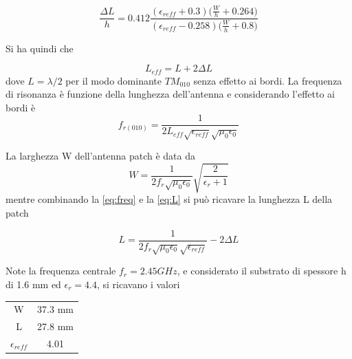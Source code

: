 \documentclass[twoside,twocolumn]{article}
\begin{document}
\begin{equation}
\frac{\Delta L}{h}= 0.412\frac{(\epsilon_{reff}+0.3)\Big(\frac{W}{h}+0.264\Big)}{(\epsilon_{reff}-0.258)\Big(\frac{W}{h}+0.8\Big)}
\end{equation}

Si ha quindi che

\begin{equation}\label{eq:L}
L_{eff}=L+2\Delta L
\end{equation}
dove $L=\lambda/2$ per il modo dominante $TM_{010}$ senza effetto ai bordi.
La frequenza di risonanza è funzione della lunghezza dell'antenna e considerando l'effetto ai bordi è 
\begin{equation} \label{eq:freq}
f_{r(010)}=\frac{1}{2L_{eff}\sqrt{\epsilon_{reff}}\sqrt{\mu_{0}\epsilon_{0}}}
\end{equation}

La larghezza W dell'antenna patch è data da 
\begin{equation}
W=\frac{1}{2f_{r}\sqrt{\mu_{0}\epsilon_{0}}}\sqrt{\frac{2}{\epsilon_{r}+1}}
\end{equation}
mentre combinando la \eqref{eq:freq} e la \eqref{eq:L} si può ricavare la lunghezza L della patch

\begin{equation}
L=\frac{1}{2f_{r}\sqrt{\mu_{0}\epsilon_{0}}\sqrt{\epsilon_{reff}}}-2\Delta L
\end{equation}

Note la frequenza centrale $f_{r}= 2.45GHz$, e considerato il  
substrato di spessore h di 1.6 mm ed $\epsilon_{r}=4.4$,
si ricavano i valori

\begin{center}
\begin{tabular}{ |c|c| } 
 \hline
 W & 37.3 mm \\ 
 L & 27.8 mm \\ 
 $\epsilon_{reff}$ & 4.01 \\
 \hline
\end{tabular}
\end{center}
\end{document}
